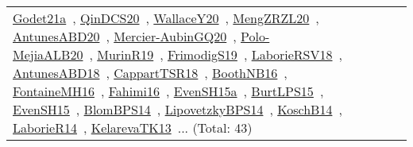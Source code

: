 {\begin{longtable}{lp{3cm}>{\raggedright\arraybackslash}p{6cm}>{\raggedright\arraybackslash}p{6cm}>{\raggedright\arraybackslash}p{8cm}}
\href{../works/Godet21a.pdf}{Godet21a}~\cite{Godet21a}, \href{../works/QinDCS20.pdf}{QinDCS20}~\cite{QinDCS20}, \href{../works/WallaceY20.pdf}{WallaceY20}~\cite{WallaceY20}, \href{../works/MengZRZL20.pdf}{MengZRZL20}~\cite{MengZRZL20}, \href{../works/AntunesABD20.pdf}{AntunesABD20}~\cite{AntunesABD20}, \href{../works/Mercier-AubinGQ20.pdf}{Mercier-AubinGQ20}~\cite{Mercier-AubinGQ20}, \href{../works/Polo-MejiaALB20.pdf}{Polo-MejiaALB20}~\cite{Polo-MejiaALB20}, \href{../works/MurinR19.pdf}{MurinR19}~\cite{MurinR19}, \href{../works/FrimodigS19.pdf}{FrimodigS19}~\cite{FrimodigS19}, \href{../works/LaborieRSV18.pdf}{LaborieRSV18}~\cite{LaborieRSV18}, \href{../works/AntunesABD18.pdf}{AntunesABD18}~\cite{AntunesABD18}, \href{../works/CappartTSR18.pdf}{CappartTSR18}~\cite{CappartTSR18}, \href{../works/BoothNB16.pdf}{BoothNB16}~\cite{BoothNB16}, \href{../works/FontaineMH16.pdf}{FontaineMH16}~\cite{FontaineMH16}, \href{../works/Fahimi16.pdf}{Fahimi16}~\cite{Fahimi16}, \href{../works/EvenSH15a.pdf}{EvenSH15a}~\cite{EvenSH15a}, \href{../works/BurtLPS15.pdf}{BurtLPS15}~\cite{BurtLPS15}, \href{../works/EvenSH15.pdf}{EvenSH15}~\cite{EvenSH15}, \href{../works/BlomBPS14.pdf}{BlomBPS14}~\cite{BlomBPS14}, \href{../works/LipovetzkyBPS14.pdf}{LipovetzkyBPS14}~\cite{LipovetzkyBPS14}, \href{../works/KoschB14.pdf}{KoschB14}~\cite{KoschB14}, \href{../works/LaborieR14.pdf}{LaborieR14}~\cite{LaborieR14}, \href{../works/KelarevaTK13.pdf}{KelarevaTK13}~\cite{KelarevaTK13}... (Total: 43)\\

\end{longtable}}
